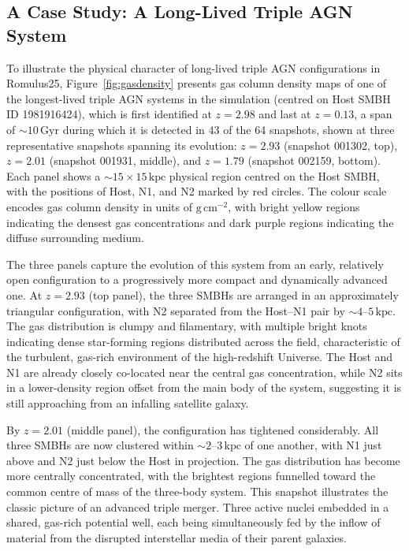 \documentclass[twocolumn, 10pt]{article}
\begin{document}
\subsection{A Case Study: A Long-Lived Triple AGN System}
\label{subsec:case_study}
 
To illustrate the physical character of long-lived triple AGN configurations in Romulus25, Figure~\ref{fig:gasdensity} presents gas column density maps of one of the longest-lived triple AGN systems in the simulation (centred on Host SMBH ID 1981916424), which is first identified at $z = 2.98$ and last at $z = 0.13$, a span of $\sim 10\,\mathrm{Gyr}$ during which it is detected in 43 of the 64 snapshots, shown at three representative snapshots spanning its evolution: $z = 2.93$ (snapshot 001302, top), $z = 2.01$ (snapshot 001931, middle), and $z = 1.79$ (snapshot 002159, bottom). Each panel shows a $\sim 15 \times 15\,\mathrm{kpc}$ physical region centred on the Host SMBH, with the positions of Host, N1, and N2 marked by red circles. The colour scale encodes gas column density in units of $\mathrm{g\,cm}^{-2}$, with bright yellow regions indicating the densest gas concentrations and dark purple regions indicating the diffuse surrounding medium.
 
The three panels capture the evolution of this system from an early, relatively open configuration to a progressively more compact and dynamically advanced one. At $z = 2.93$ (top panel), the three SMBHs are arranged in an approximately triangular configuration, with N2 separated from the Host--N1 pair by $\sim 4$--$5\,\mathrm{kpc}$. The gas distribution is clumpy and filamentary, with multiple bright knots indicating dense star-forming regions distributed across the field, characteristic of the turbulent, gas-rich environment of the high-redshift Universe. The Host and N1 are already closely co-located near the central gas concentration, while N2 sits in a lower-density region offset from the main body of the system, suggesting it is still approaching from an infalling satellite galaxy.
 
By $z = 2.01$ (middle panel), the configuration has tightened considerably. All three SMBHs are now clustered within $\sim 2$--$3\,\mathrm{kpc}$ of one another, with N1 just above and N2 just below the Host in projection. The gas distribution has become more centrally concentrated, with the brightest regions funnelled toward the common centre of mass of the three-body system. This snapshot illustrates the classic picture of an advanced triple merger. Three active nuclei embedded in a shared, gas-rich potential well, each being simultaneously fed by the inflow of material from the disrupted interstellar media of their parent galaxies.
 
\end{document}
